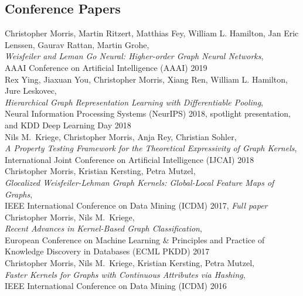 \documentclass[11pt, a4paper]{scrartcl}
\newcommand{\years}[1]{\marginnote {\textbf{#1}}}
\begin{document}
\subsection*{Conference Papers}

\years{2019}Christopher Morris, Martin Ritzert, Matthias Fey, William L. Hamilton, Jan Eric Lenssen, Gaurav Rattan, Martin Grohe,  \\
\emph{Weisfeiler and Leman Go Neural: Higher-order Graph Neural Networks},\\
AAAI Conference on Artificial Intelligence (AAAI) 2019 \\

\years{2018} Rex Ying, Jiaxuan You, Christopher Morris, Xiang Ren, William L. Hamilton, Jure Leskovec, \\
\emph{Hierarchical Graph Representation Learning with Differentiable Pooling},\\
 Neural Information Processing Systems (NeurIPS) 2018, spotlight presentation, and KDD Deep Learning Day 2018 \\

Nils M.~Kriege, Christopher Morris, Anja Rey, Christian Sohler,\\
\emph{A Property Testing Framework for the Theoretical Expressivity of Graph Kernels},\\
International Joint Conference on Artificial Intelligence (IJCAI) 2018\\

\years{2017} Christopher Morris, Kristian Kersting, Petra Mutzel,\\
\emph{Glocalized Weisfeiler-Lehman Graph Kernels: Global-Local Feature Maps of Graphs},\\
IEEE International Conference on Data Mining (ICDM) 2017, \emph{Full paper}\\

 Christopher Morris, Nils M.~Kriege,\\
\emph{Recent Advances in Kernel-Based Graph Classification},\\
European Conference on Machine Learning \& Principles and Practice of Knowledge Discovery in Databases (ECML PKDD) 2017\\

\years{2016} Christopher Morris, Nils M.~Kriege, Kristian Kersting, Petra Mutzel,\\
\emph{Faster Kernels for Graphs with Continuous Attributes via Hashing},\\
IEEE International Conference on Data Mining (ICDM) 2016
\end{document}
